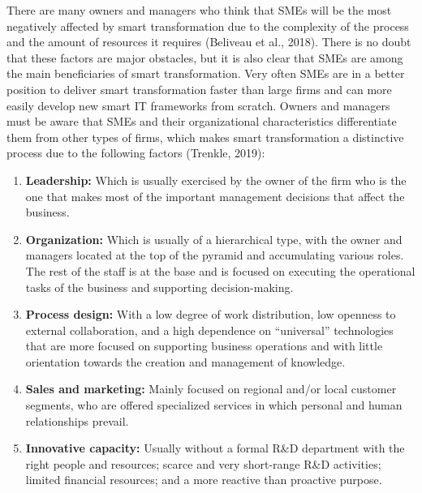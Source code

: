 \documentclass[
  letterpaper,
  DIV=11,
  numbers=noendperiod]{scrreprt}
\begin{document}
There are many owners and managers who think that SMEs will be the most
negatively affected by smart transformation due to the complexity of the
process and the amount of resources it requires (Beliveau et al., 2018).
There is no doubt that these factors are major obstacles, but it is also
clear that SMEs are among the main beneficiaries of smart
transformation. Very often SMEs are in a better position to deliver
smart transformation faster than large firms and can more easily develop
new smart IT frameworks from scratch. Owners and managers must be aware
that SMEs and their organizational characteristics differentiate them
from other types of firms, which makes smart transformation a
distinctive process due to the following factors (Trenkle, 2019):

\begin{enumerate}
\def\labelenumi{\arabic{enumi}.}
\item
  \textbf{Leadership:} Which is usually exercised by the owner of the
  firm who is the one that makes most of the important management
  decisions that affect the business.
\item
  \textbf{Organization:} Which is usually of a hierarchical type, with
  the owner and managers located at the top of the pyramid and
  accumulating various roles. The rest of the staff is at the base and
  is focused on executing the operational tasks of the business and
  supporting decision-making.
\item
  \textbf{Process design:} With a low degree of work distribution, low
  openness to external collaboration, and a high dependence on
  ``universal'' technologies that are more focused on supporting
  business operations and with little orientation towards the creation
  and management of knowledge.
\item
  \textbf{Sales and marketing:} Mainly focused on regional and/or local
  customer segments, who are offered specialized services in which
  personal and human relationships prevail.
\item
  \textbf{Innovative capacity:} Usually without a formal R\&D department
  with the right people and resources; scarce and very short-range R\&D
  activities; limited financial resources; and a more reactive than
  proactive purpose.
\end{enumerate}
\end{document}
